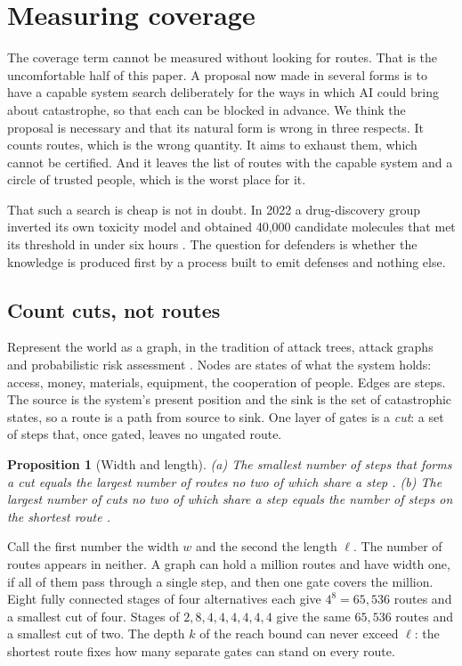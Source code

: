 \documentclass[10pt,twocolumn]{article}
\theoremstyle{plain}
\newtheorem{proposition}{Proposition}
\theoremstyle{definition}
\begin{document}
\section{Measuring coverage}\label{sec:search}

The coverage term cannot be measured without looking for routes. That is the uncomfortable
half of this paper. A proposal now made in several forms is to have a capable system search
deliberately for the ways in which AI could bring about catastrophe, so that each can be
blocked in advance. We think the proposal is necessary and that its natural form is wrong in
three respects. It counts routes, which is the wrong quantity. It aims to exhaust them, which
cannot be certified. And it leaves the list of routes with the capable system and a circle of
trusted people, which is the worst place for it.

That such a search is cheap is not in doubt. In 2022 a drug-discovery group inverted its own
toxicity model and obtained 40,000 candidate molecules that met its threshold in under six
hours \cite{urbina2022}. The question for defenders is whether the knowledge is produced
first by a process built to emit defenses and nothing else.

\subsection{Count cuts, not routes}

Represent the world as a graph, in the tradition of attack trees, attack graphs and
probabilistic risk assessment \cite{schneier1999,sheyner2002,wash1400}. Nodes are states of what the system holds: access, money,
materials, equipment, the cooperation of people. Edges are steps. The source is the system's
present position and the sink is the set of catastrophic states, so a route is a path from
source to sink. One layer of gates is a \emph{cut}: a set of steps that, once gated, leaves
no ungated route.

\begin{proposition}[Width and length]\label{prop:graph}
(a) The smallest number of steps that forms a cut equals the largest number of routes no two
of which share a step \cite{menger1927,ford1956}. (b) The largest number of cuts no two of
which share a step equals the number of steps on the shortest route \cite{robacker1956}.
\end{proposition}

Call the first number the width $w$ and the second the length $\ell$. The number of routes
appears in neither. A graph can hold a million routes and have width one, if all of them pass
through a single step, and then one gate covers the million. Eight fully
connected stages of four alternatives each give $4^{8}=65{,}536$ routes and a smallest cut of
four. Stages of $2,8,4,4,4,4,4,4$ give the same $65{,}536$ routes and a smallest cut of
two. The depth $k$ of the reach
bound can never exceed $\ell$: the shortest route fixes how many separate gates can stand on every route.
\end{document}
